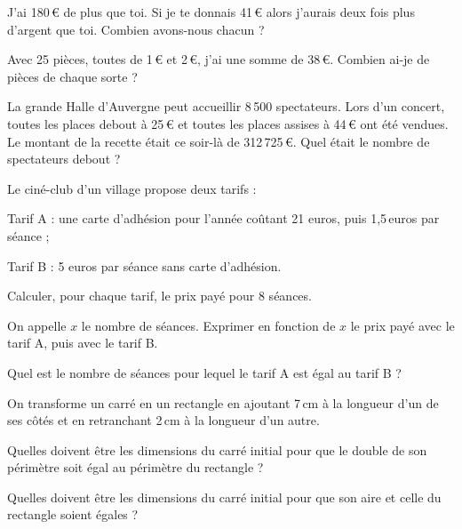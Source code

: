 \begin{exercice}[]
J'ai 180\,€ de plus que toi. Si je te donnais 41\,€ alors j'aurais deux fois plus d'argent que toi. Combien avons-nous chacun ?
\end{exercice}

\begin{exercice}[Pièces]
Avec 25 pièces, toutes de 1\,€ et 2\,€, j'ai une somme de 38\,€.
Combien ai-je de pièces de chaque sorte ?
\end{exercice}



\begin{exercice}[Le concert]

La grande Halle d'Auvergne peut accueillir 8\,500 spectateurs. Lors d'un concert, toutes les places debout à 25\,€ et toutes les places assises à 44\,€ ont été vendues. Le montant de la recette était ce soir-là de 312\,725\,€. 
Quel était le nombre de spectateurs debout ? 
\end{exercice}




\begin{exercice}[Cinéma]

Le ciné-club d'un village propose deux tarifs :

Tarif A : une carte d'adhésion pour l'année coûtant 21 euros, puis 1,5\,euros par séance ;

Tarif B : 5 euros par séance sans carte d'adhésion.

\begin{colenumerate}{1} 
\item Calculer, pour chaque tarif, le prix payé pour 8 séances.
\item On appelle $x$ le nombre de séances. Exprimer en fonction de $x$ le prix payé avec le tarif A, puis avec le tarif B.
\item Quel est le nombre de séances pour lequel le tarif A est égal au tarif B ?
\end{colenumerate} 
 \end{exercice}







\begin{exercice}[]
On transforme un carré en un rectangle en ajoutant 7\,cm à la longueur d'un de ses côtés et en retranchant 2\,cm à la longueur d'un autre. 

\begin{colenumerate}{1} 
\item Quelles doivent être les dimensions du carré initial pour que le double de son périmètre soit égal au périmètre du rectangle ?
\item Quelles doivent être les dimensions du carré initial pour que son aire et celle du rectangle soient égales ? 
\end{colenumerate} 
\end{exercice}




